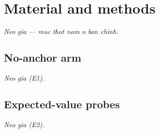 \documentclass[10pt,twocolumn,a4paper]{article}
\begin{document}
\section{Material and methods}\label{sec:methods}
\emph{Neo gia — muc that nam o ban chinh.}
\subsection{No-anchor arm}\label{sec:nohint}
\emph{Neo gia (E1).}
\subsection{Expected-value probes}\label{sec:evprobe}
\emph{Neo gia (E2).}


\end{document}
